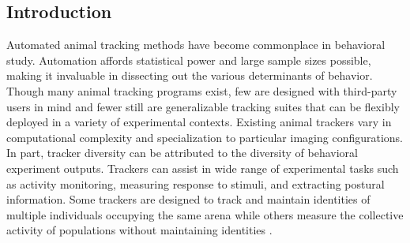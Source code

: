 \documentclass[10pt]{article}
\begin{document}
\vspace{1cm}
\begin{multicols}{2}
\section*{Introduction}

Automated animal tracking methods have become commonplace in behavioral study. Automation affords statistical power and large sample sizes possible, making it invaluable in dissecting out the various determinants of behavior. Though many animal tracking programs exist, few are designed with third-party users in mind and fewer still are generalizable tracking suites that can be flexibly deployed in a variety of experimental contexts. Existing animal trackers vary in computational complexity and specialization to particular imaging configurations. In part, tracker diversity can be attributed to the diversity of behavioral experiment outputs. Trackers can assist in wide range of experimental tasks such as activity monitoring, measuring response to stimuli\cite{Fry_TrackFly_2008,Donelson_High_2012}, and extracting postural information\cite{Mathis_DeepLabCut_2018,Pereira_Fast_2018}. Some trackers are designed to track and maintain identities of multiple individuals occupying the same arena \cite{Prez-Escudero_idTracker_2014,Eyjolfsdottir_Detecting_2014} while others measure the collective activity of populations without maintaining identities \cite{Ramot_The_2008,Swierczek_High_2011,Itskovits_A_2017,Rodriguez_ToxId_2017}. 


\end{multicols}
\end{document}
